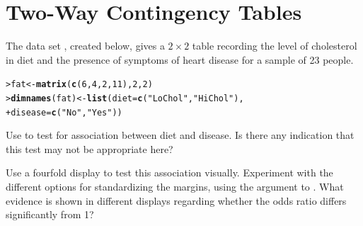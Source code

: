 \documentclass[10pt]{report}\usepackage[]{graphicx}\usepackage[]{color}
\makeatletter
\newcommand{\hlnum}[1]{\textcolor[rgb]{0.686,0.059,0.569}{#1}}%
\newcommand{\hlstr}[1]{\textcolor[rgb]{0.192,0.494,0.8}{#1}}%
\newcommand{\hlstd}[1]{\textcolor[rgb]{0.345,0.345,0.345}{#1}}%
\newcommand{\hlkwb}[1]{\textcolor[rgb]{0.69,0.353,0.396}{#1}}%
\newcommand{\hlkwc}[1]{\textcolor[rgb]{0.333,0.667,0.333}{#1}}%
\newcommand{\hlkwd}[1]{\textcolor[rgb]{0.737,0.353,0.396}{\textbf{#1}}}%
\newenvironment{kframe}{%
 \def\at@end@of@kframe{}%
 \ifinner\ifhmode%
  \def\at@end@of@kframe{\end{minipage}}%
  \begin{minipage}{\columnwidth}%
 \fi\fi%
 \def\FrameCommand##1{\hskip\@totalleftmargin \hskip-\fboxsep
 \colorbox{shadecolor}{##1}\hskip-\fboxsep
     \hskip-\linewidth \hskip-\@totalleftmargin \hskip\columnwidth}%
 \MakeFramed {\advance\hsize-\width
   \@totalleftmargin\z@ \linewidth\hsize
   \@setminipage}}%
 {\par\unskip\endMakeFramed%
 \at@end@of@kframe}
\newenvironment{knitrout}{}{} %
\renewenvironment{knitrout}{\small\renewcommand{\baselinestretch}{.85}}{} %
\makeatother
\begin{document}
\chapter{Two-Way Contingency Tables}\label{ch:twoway}


\begin{Exercises}

  \exercise The data set , created below, gives a $2 \times 2$ table recording the level of
  cholesterol in diet and the presence of symptoms of heart disease for a sample of
  23 people.

\begin{knitrout}\footnotesize
{}\color{fgcolor}\begin{kframe}
\begin{alltt}
\hlstd{> }\hlstd{fat} \hlkwb{<-} \hlkwd{matrix}\hlstd{(}\hlkwd{c}\hlstd{(}\hlnum{6}\hlstd{,} \hlnum{4}\hlstd{,} \hlnum{2}\hlstd{,} \hlnum{11}\hlstd{),} \hlnum{2}\hlstd{,} \hlnum{2}\hlstd{)}
\hlstd{> }\hlkwd{dimnames}\hlstd{(fat)} \hlkwb{<-} \hlkwd{list}\hlstd{(}\hlkwc{diet} \hlstd{=} \hlkwd{c}\hlstd{(}\hlstr{"LoChol"}\hlstd{,} \hlstr{"HiChol"}\hlstd{),}
\hlstd{+ }                      \hlkwc{disease} \hlstd{=} \hlkwd{c}\hlstd{(}\hlstr{"No"}\hlstd{,} \hlstr{"Yes"}\hlstd{))}
\end{alltt}
\end{kframe}
\end{knitrout}

  \begin{enumerate*}
    \item Use  to test for association between diet and disease.
    Is there any indication that this test may not be appropriate here?
    \begin{ans}
    \end{ans}
    
    
    \item Use a fourfold display to test this association visually.  Experiment with    
    the different options for standardizing the margins, using the 
    argument to . What evidence is shown in different displays regarding
    whether the odds ratio differs significantly from 1?
    \begin{ans}
    \end{ans}
    

\end{enumerate*}
\end{Exercises}
\end{document}
